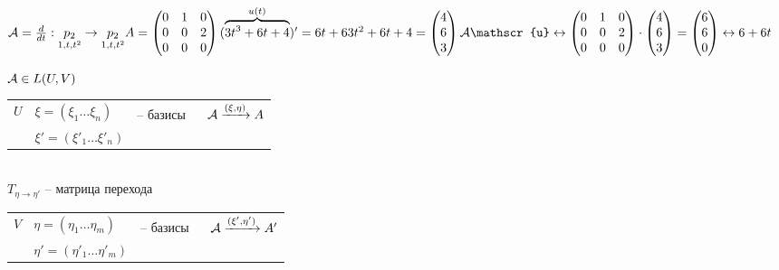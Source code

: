 \documentclass[../spring.tex]{subfiles}
\begin{document}
\begin{examples}
\begin{mylist}
\begin{multicols}{2}
			\end{multicols}
			\item 
			$\A = \frac{d}{dt}: \underset{1, t, t^2}{p_2} \rightarrow \underset{1, t, t^2}{p_2}\\
			A = \begin{pmatrix}
			0 & 1 & 0\\
			0 & 0 & 2\\
			0 & 0&0
			\end{pmatrix}\\
			(\overbrace{3t^3 + 6t + 4}^{u(t)})' = 6t + 6\\
			3t^2 + 6t + 4 = \begin{pmatrix}
			4\\6\\3
			\end{pmatrix}\\
			\A\mathscr{u} \leftrightarrow \begin{pmatrix}
			0&1&0\\0&0&2\\
			0&0&0
			\end{pmatrix}\cdot
			\begin{pmatrix}
			4\\6\\3
			\end{pmatrix}
			= \begin{pmatrix}
			6\\6\\0
			\end{pmatrix} \leftrightarrow 6 + 6t$
		\end{mylist}
	\end{examples}
	\begin{theorem}
		$\mathcal{A} \in L(U, V)$\\
		\begin{tabular}{lll}
			$U$ & $\xi = (\xi_1\ldots\xi_n)$ & -- базисы  $\ \ \ \ \A \xrightarrow{(\xi, \eta)} A$\\
			& $\xi' = (\xi'_1\ldots\xi'_n)$
		\end{tabular}\\
		$T_{\eta\rightarrow\eta'}$ -- матрица перехода\\
		\begin{tabular}{lll}
			$V$ & $\eta = (\eta_1\ldots\eta_m)$ & -- базисы  $\ \ \ \ \A \xrightarrow{(\xi', \eta')} A'$\\
			& $\eta' = (\eta'_1\ldots\eta'_m)$
		\end{tabular}\\
	\end{theorem}
\end{document}

